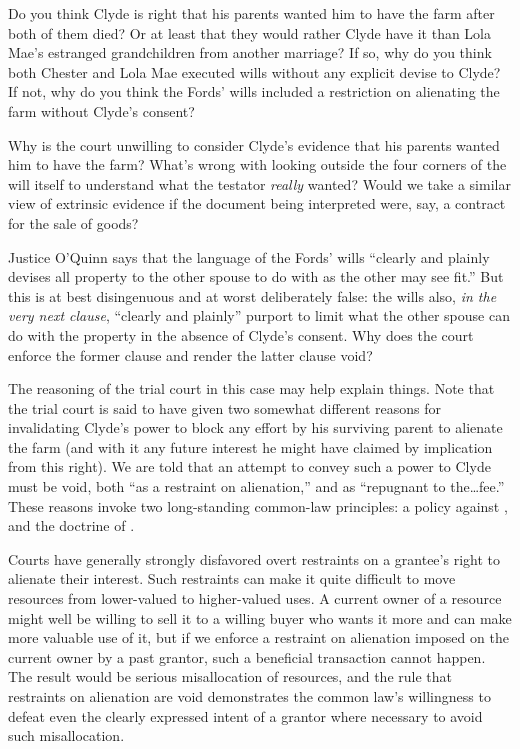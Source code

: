 
\item Do you think Clyde is right that his parents wanted him to have the farm
after both of them died? Or at least that they would rather Clyde have it than
Lola Mae's estranged grandchildren from another marriage? If so, why do you
think both Chester and Lola Mae executed wills without any explicit devise to
Clyde? If not, why do you think the Fords' wills included a restriction on
alienating the farm without Clyde's consent? 


\item Why is the court unwilling to consider Clyde's evidence that his parents
wanted him to have the farm? What's wrong with looking outside the four corners
of the will itself to understand what the testator \textit{really} wanted?
Would we take a similar view of extrinsic evidence if the document being
interpreted were, say, a contract for the sale of goods?


\item Justice O'Quinn says that the language of the Fords' wills ``clearly and
plainly devises all property to the other spouse to do with as the other may
see fit.'' But this is at best disingenuous and at worst deliberately false:
the wills also, \textit{in the very next clause}, ``clearly and plainly''
purport to limit what the other spouse can do with the property in the absence
of Clyde's consent. Why does the court enforce the former clause and render the
latter clause void? 


The reasoning of the trial court in this case may help explain things. Note that
the trial court is said to have given two somewhat different reasons for
invalidating Clyde's power to block any effort by his surviving parent to
alienate the farm (and with it any future interest he might have claimed by
implication from this right). We are told that an attempt to convey such a
power to Clyde must be void, both ``as a restraint on alienation,'' and as
``repugnant to the\dots fee.'' These reasons invoke two long-standing
common-law principles: a policy against , and the
doctrine of .



Courts have generally strongly disfavored overt restraints on a grantee's right
to alienate their interest. Such restraints can make it quite difficult to move
resources from lower-valued to higher-valued uses. A current owner of a
resource might well be willing to sell it to a willing buyer who wants it more
and can make more valuable use of it, but if we enforce a restraint on
alienation imposed on the current owner by a past grantor, such a beneficial
transaction cannot happen. The result would be serious misallocation of
resources, and the rule that restraints on alienation are void demonstrates the
common law's willingness to defeat even the clearly expressed intent of a
grantor where necessary to avoid such misallocation.



